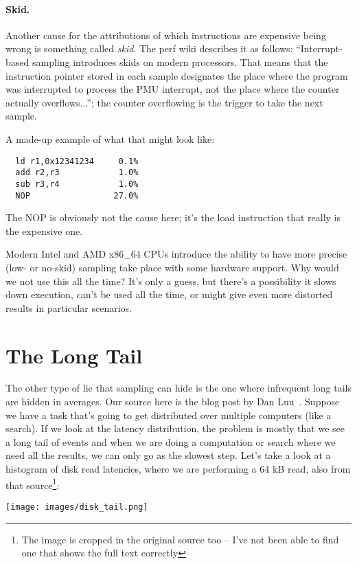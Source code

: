 \paragraph{Skid.}
Another cause for the attributions of which instructions are expensive being wrong is something called \textit{skid}. The perf wiki describes it as follows: ``Interrupt-based sampling introduces skids on modern processors. That means that the instruction pointer stored in each sample designates the place where the program was interrupted to process the PMU interrupt, not the place where the counter actually overflows...''; the counter overflowing is the trigger to take the next sample.

A made-up example of what that might look like:
\begin{verbatim}
  ld r1,0x12341234     0.1%
  add r2,r3            1.0%
  sub r3,r4            1.0%
  NOP                 27.0%
\end{verbatim}
The NOP is obviously not the cause here; it's the load instruction that really is the expensive one.


Modern Intel and AMD x86\_64 CPUs introduce the ability to have more precise (low- or no-skid) sampling take place with some hardware support. Why would we not use this all the time? It's only a guess, but there's a possibility it slows down execution, can't be used all the time, or might give even more distorted results in particular scenarios.

\section*{The Long Tail}

The other type of lie that sampling can hide is the one where infrequent long tails are hidden in averages.
Our source here is the blog post by Dan Luu~\cite{perf-tracing}. Suppose we have a task that's going to get distributed over multiple computers (like a search). If we look at the latency distribution, the problem is mostly that we see a long tail of events and when we are doing a computation or search where we need all the results, we can only go as the slowest step. Let's take a look at a histogram of disk read latencies, where we are performing a 64 kB read, also from that source\footnote{The image is cropped in the original source too -- I've not been able to find one that shows the full text correctly}:

\begin{center}
	\texttt{[image: images/disk\_tail.png]}
\end{center}

